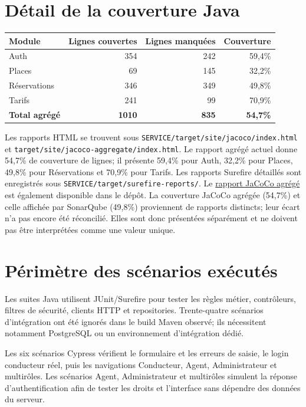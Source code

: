 \documentclass[11pt,a4paper]{report}
\begin{document}
\section{Détail de la couverture Java}
\begin{center}
\begin{tabular}{lrrr}
\toprule
\textbf{Module} & \textbf{Lignes couvertes} & \textbf{Lignes manquées} & \textbf{Couverture} \\
\midrule
Auth & 354 & 242 & 59,4\% \\
Places & 69 & 145 & 32,2\% \\
Réservations & 346 & 349 & 49,8\% \\
Tarifs & 241 & 99 & 70,9\% \\
\midrule
\textbf{Total agrégé} & \textbf{1010} & \textbf{835} & \textbf{54,7\%} \\
\bottomrule
\end{tabular}
\end{center}
Les rapports HTML se trouvent sous \texttt{SERVICE/target/site/jacoco/index.html} et \texttt{target/site/jacoco-aggregate/index.html}. Le rapport agrégé actuel donne 54,7\% de couverture de lignes; il présente 59,4\% pour Auth, 32,2\% pour Places, 49,8\% pour Réservations et 70,9\% pour Tarifs. Les rapports Surefire détaillés sont enregistrés sous \texttt{SERVICE/target/surefire-reports/}. Le \href{../../target/site/jacoco-aggregate/index.html}{rapport JaCoCo agrégé} est également disponible dans le dépôt.
La couverture JaCoCo agrégée (54,7\%) et celle affichée par SonarQube (49,8\%) proviennent de rapports distincts; leur écart n'a pas encore été réconcilié. Elles sont donc présentées séparément et ne doivent pas être interprétées comme une valeur unique.

\section{Périmètre des scénarios exécutés}
Les suites Java utilisent JUnit/Surefire pour tester les règles métier, contrôleurs, filtres de sécurité, clients HTTP et repositories. Trente-quatre scénarios d'intégration ont été ignorés dans le build Maven observé; ils nécessitent notamment PostgreSQL ou un environnement d'intégration dédié.

Les six scénarios Cypress vérifient le formulaire et les erreurs de saisie, le login conducteur réel, puis les navigations Conducteur, Agent, Administrateur et multirôles. Les scénarios Agent, Administrateur et multirôles simulent la réponse d'authentification afin de tester les droits et l'interface sans dépendre des données du serveur.
\end{document}
